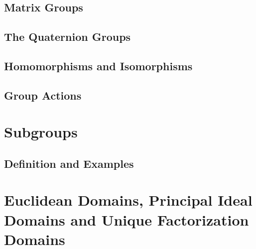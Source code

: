 \documentclass[cn,11pt,chinese]{elegantbook}
\numberwithin{equation}{section}
\begin{document}
\section{Matrix Groups}\label{section00104}



\section{The Quaternion Groups}\label{section00105}



\section{Homomorphisms and Isomorphisms}\label{section00106}



\section{Group Actions}\label{section00107}




\chapter{Subgroups}\label{chapter002}
\section{Definition and Examples}\label{section00201}


\chapter{Euclidean Domains, Principal Ideal Domains and Unique Factorization Domains}\label{chapter008}





% 

\appendix
\end{document}
